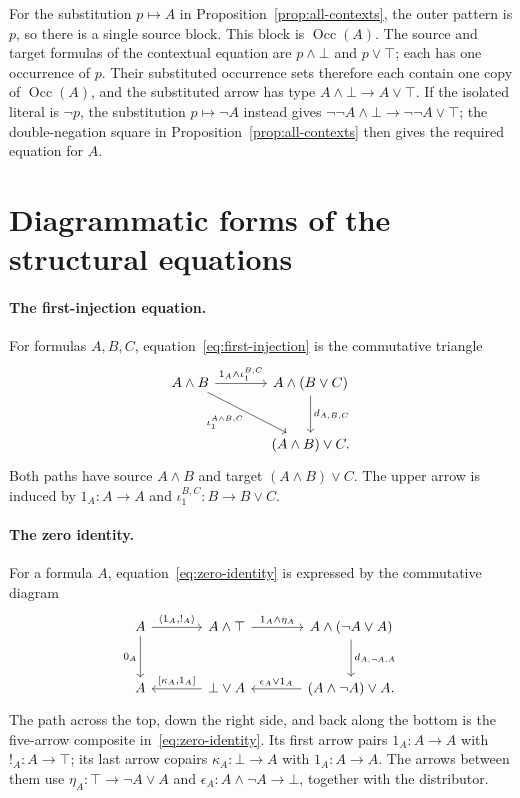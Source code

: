 \documentclass[11pt]{article}
\newcommand{\Occ}{\operatorname{Occ}}
\begin{document}
For the substitution $p\mapsto A$ in
Proposition~\ref{prop:all-contexts}, the outer pattern is $p$,
so there is a single source block. This block is $\Occ(A)$.
The source and target formulas of the contextual equation are
$p\wedge\bot$ and $p\vee\top$; each has one occurrence of $p$. Their substituted occurrence sets therefore each
contain one copy of $\Occ(A)$, and the substituted arrow has type
$A\wedge\bot\to A\vee\top$. If the isolated literal is $\neg p$,
the substitution $p\mapsto\neg A$ instead gives
$\neg\neg A\wedge\bot\to\neg\neg A\vee\top$; the
double-negation square in Proposition~\ref{prop:all-contexts}
then gives the required equation for $A$.

\section{Diagrammatic forms of the structural equations}
\label{app:structural-diagrams}

\paragraph{The first-injection equation.}
For formulas $A,B,C$, equation~\eqref{eq:first-injection} is the
commutative triangle
\[
\begin{tikzcd}[column sep=large,row sep=large]
 A\wedge B
   \arrow[r,"1_A\wedge\iota_1^{B,C}"]
   \arrow[dr,"{\iota_1^{A\wedge B,C}}"']
   &A\wedge(B\vee C)\arrow[d,"d_{A,B,C}"]\\
   &(A\wedge B)\vee C.
\end{tikzcd}
\]
Both paths have source $A\wedge B$ and target $(A\wedge B)\vee C$.
The upper arrow is induced by $1_A:A\to A$ and
$\iota_1^{B,C}:B\to B\vee C$.

\paragraph{The zero identity.}
For a formula $A$, equation~\eqref{eq:zero-identity} is expressed by
the commutative diagram
\[
\begin{tikzcd}[column sep=large,row sep=large]
 A\arrow[r,"{\langle1_A,!_A\rangle}"]\arrow[d,"0_A"']
   &A\wedge\top\arrow[r,"1_A\wedge\eta_A"]
   &A\wedge(\neg A\vee A)\arrow[d,"d_{A,\neg A,A}"]\\
 A
   &\bot\vee A\arrow[l,"{[\kappa_A,1_A]}"']
   &(A\wedge\neg A)\vee A\arrow[l,"\epsilon_A\vee1_A"'].
\end{tikzcd}
\]
The path across the top, down the right side, and back along the
bottom is the five-arrow composite in~\eqref{eq:zero-identity}.
Its first arrow pairs $1_A:A\to A$ with $!_A:A\to\top$;
its last arrow copairs $\kappa_A:\bot\to A$ with $1_A:A\to A$.
The arrows between them use
$\eta_A:\top\to\neg A\vee A$ and
$\epsilon_A:A\wedge\neg A\to\bot$, together with the distributor.
\end{document}
